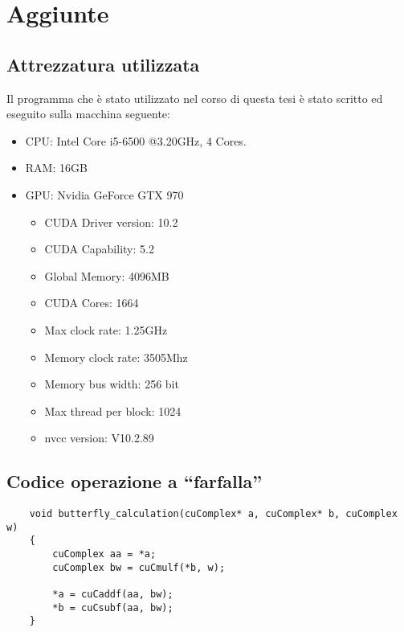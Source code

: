 \chapter{Aggiunte}
\section{Attrezzatura utilizzata}
Il programma che è stato utilizzato nel corso di questa tesi è stato scritto ed eseguito sulla macchina seguente:
\begin{itemize}[nosep]
    \item CPU: Intel Core i5-6500 @3.20GHz, 4 Cores.
    \item RAM: 16GB
    \item GPU: Nvidia GeForce GTX 970
    \begin{itemize}[nosep]
        \item CUDA Driver version: 10.2
        \item CUDA Capability: 5.2
        \item Global Memory: 4096MB
        \item CUDA Cores: 1664
        \item Max clock rate: 1.25GHz
        \item Memory clock rate: 3505Mhz
        \item Memory bus width: 256 bit
        \item Max thread per block: 1024
        \item nvcc version: V10.2.89
    \end{itemize}
\end{itemize}

\section{Codice operazione a ``farfalla''}
\begin{lstlisting}
    void butterfly_calculation(cuComplex* a, cuComplex* b, cuComplex w)
    {
        cuComplex aa = *a;
        cuComplex bw = cuCmulf(*b, w);
    
        *a = cuCaddf(aa, bw);
        *b = cuCsubf(aa, bw);
    }    
\end{lstlisting}